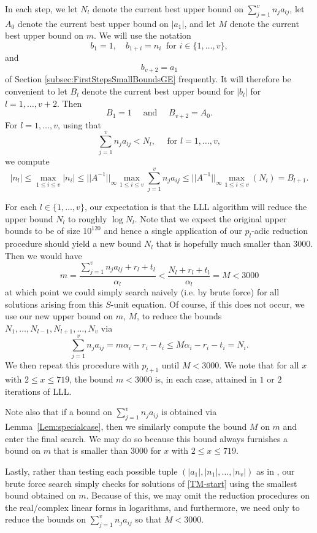 In each step, we let $N_l$ denote the current best upper bound on $\sum_{j = 1}^v n_ja_{lj}$, let $A_0$ denote the current best upper bound on $|a_1|$, and let $M$ denote the current best upper bound on $m$. We will use the notation 
\[b_1 = 1, \quad b_{1+i} = n_i \ \text{ for } i \in \{1, \dots, v\},\]
and
\[ b_{v+2} = a_1\]
of Section \autoref{subsec:FirstStepsSmallBoundsGE} frequently. It will therefore be convenient to let $B_l$ denote the current best upper bound for $|b_l|$ for $l = 1, \dots, v+2$. Then
\[B_1 = 1 \quad \text{ and } \quad B_{v+2} = A_0.\]
For $l = 1, \dots, v$, using that
\[ \sum_{j = 1}^v n_ja_{lj} < N_l, \quad \text{ for } l = 1, \dots, v,\]
we compute
\[|n_l| \leq \max_{1 \leq i \leq v}|n_i| \leq ||A^{-1}||_{\infty}\max_{1 \leq i\leq v}\sum_{j = 1}^v n_j a_{ij}
\leq ||A^{-1}||_{\infty} \max_{1 \leq i\leq v}(N_i) = B_{l+1}.\]

For each $l \in \{1, \dots, v\}$, our expectation is that the LLL algorithm will reduce the upper bound $N_l$ to roughly $\log{N_l}$. Note that we expect the original upper bounds to be of size $10^{120}$ and hence a single application of our $p_l$-adic reduction procedure should yield a new bound $N_l$ that is hopefully much smaller than $3000$. Then we would have
$$
m = \frac{\sum_{j = 1}^{v}n_ja_{lj} + r_l + t_l}{\alpha_l} < \frac{N_l+ r_l + t_l}{\alpha_l} = M < 3000
$$
at which point we could simply search naively (i.e. by brute force)  for all solutions arising from this $S$-unit equation. Of course, if this does not occur, we use our new upper bound on $m$, $M$, to reduce the bounds $N_1, \dots, N_{l-1}, N_{l+1}, \dots, N_v$ via
\[\sum_{j=1}^v n_ja_{ij} = m\alpha_i - r_i - t_i \leq M\alpha_i - r_i - t_i = N_i.\]
We then repeat this procedure with $p_{l+1}$ until $M < 3000$. We note that for all $x$ with $2 \leq x \leq 719$, the bound $m < 3000$ is, in each case, attained in $1$ or $2$ iterations of LLL.

Note also that if a bound on $\sum_{j = 1}^v n_ja_{ij}$ is obtained via Lemma~\ref{Lem:specialcase}, then we similarly compute the bound $M$ on $m$ and enter the final search. We may do so because this bound always furnishes a bound on $m$ that is smaller than $3000$ for $x$ with $2 \leq x \leq 719$. 

Lastly, rather than testing each possible tuple $(|a_1|,|n_1|, \dots, |n_v|)$ as in \cite{TW3}, our brute force search simply checks for solutions of \eqref{TM-start} using the smallest bound obtained on $m$. Because of this, we may omit the reduction procedures on the real/complex linear forms in logarithms, and furthermore, we need only to reduce the bounds on $\sum_{j = 1}^v n_ja_{ij}$ so that $M < 3000$. 

